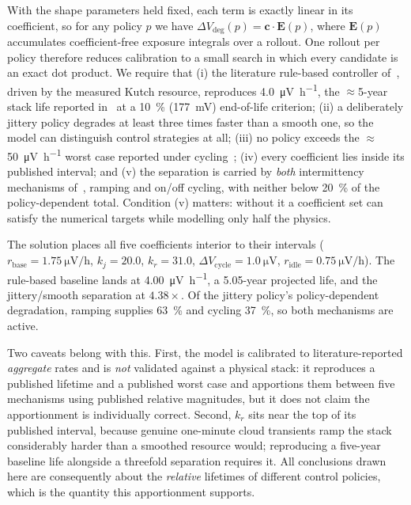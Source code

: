 \documentclass[conference]{IEEEtran}
\newcommand{\dVdeg}{\Delta V_{\mathrm{deg}}}
\begin{document}
With the shape parameters held fixed, each term is exactly linear in its coefficient, so
for any policy $p$ we have $\dVdeg(p)=\mathbf{c}\cdot\mathbf{E}(p)$, where $\mathbf{E}(p)$
accumulates coefficient-free exposure integrals over a rollout. One rollout per policy
therefore reduces calibration to a small search in which every candidate is an exact dot
product. We require that (i) the literature rule-based controller
of~\cite{pvt_control_2026}, driven by the measured Kutch resource, reproduces
\SI{4.0}{\micro\volt\per\hour}, the $\approx$5-year stack life reported
in~\cite{mpc_refuel_2026} at a \SI{10}{\percent} (\SI{177}{\milli\volt}) end-of-life
criterion; (ii) a deliberately jittery policy degrades at least three times faster than a
smooth one, so the model can distinguish control strategies at all; (iii) no policy exceeds
the $\approx$\SI{50}{\micro\volt\per\hour} worst case reported under
cycling~\cite{intermittency2025}; (iv) every coefficient lies inside its published
interval; and (v) the separation is carried by \emph{both} intermittency mechanisms
of~\cite{intermittency2025}, ramping and on/off cycling, with neither below
\SI{20}{\percent} of the policy-dependent total. Condition (v) matters: without it a
coefficient set can satisfy the numerical targets while modelling only half the physics.

The solution places all five coefficients interior to their intervals
($r_\mathrm{base}=\SI{1.75}{\micro\volt\per\hour}$, $k_j=20.0$, $k_r=31.0$,
$\Delta V_\mathrm{cycle}=\SI{1.0}{\micro\volt}$,
$r_\mathrm{idle}=\SI{0.75}{\micro\volt\per\hour}$). The rule-based baseline lands at
\SI{4.00}{\micro\volt\per\hour}, a 5.05-year projected life, and the jittery/smooth
separation at $4.38\times$. Of the jittery policy's policy-dependent degradation, ramping
supplies \SI{63}{\percent} and cycling \SI{37}{\percent}, so both mechanisms are active.

Two caveats belong with this. First, the model is calibrated to literature-reported
\emph{aggregate} rates and is \emph{not} validated against a physical stack: it reproduces
a published lifetime and a published worst case and apportions them between five mechanisms
using published relative magnitudes, but it does not claim the apportionment is
individually correct. Second, $k_r$ sits near the top of its published interval, because
genuine one-minute cloud transients ramp the stack considerably harder than a smoothed
resource would; reproducing a five-year baseline life alongside a threefold separation
requires it. All conclusions drawn here are consequently about the \emph{relative}
lifetimes of different control policies, which is the quantity this apportionment supports.
\end{document}
